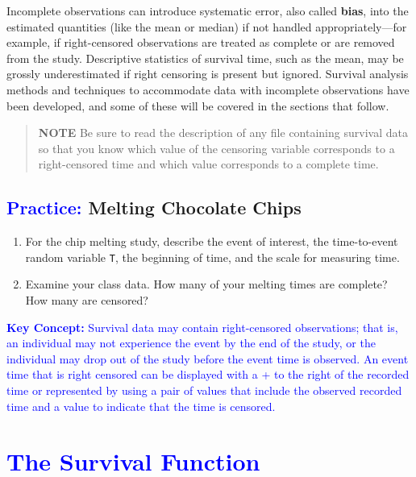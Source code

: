 \documentclass[
]{report}
\begin{document}
Incomplete observations can introduce systematic error, also called \textbf{bias}, into the estimated quantities (like the mean or median) if not handled appropriately---for example, if right-censored observations are treated as complete or are removed from the study. Descriptive statistics of survival time, such as the mean, may be grossly underestimated if right censoring is present but ignored. Survival analysis methods and techniques to accommodate data with incomplete observations have been developed, and some of these will be covered in the sections that follow.

\begin{quote}
\textbf{NOTE}
Be sure to read the description of any file containing survival data so that you know which value of the censoring variable corresponds to a right-censored time and which value corresponds to a complete time.
\end{quote}

\hypertarget{melting-chocolate-chips-1}{%
\subsection*{\texorpdfstring{\textcolor{blue}{Practice:} Melting Chocolate Chips}{ Melting Chocolate Chips}}\label{melting-chocolate-chips-1}}

\begin{enumerate}
\def\labelenumi{\arabic{enumi}.}
\setcounter{enumi}{1}
\item
  For the chip melting study, describe the event of interest, the time-to-event random variable \texttt{T}, the beginning of time, and the scale for measuring time.
\item
  Examine your class data. How many of your melting times are complete? How many are censored?
\end{enumerate}

\textbf{\textcolor{blue}{Key Concept:}}
\textcolor{blue}{Survival data may contain right-censored observations; that is, an individual may not experience the event by the end of the study, or the individual may drop out of the study before the event time is observed. An event time that is right censored can be displayed with a + to the right of the recorded time or represented by using a pair of values that include the observed recorded time and a value to indicate that the time is censored.}

\hypertarget{section-79}{%
\section{\texorpdfstring{\textcolor{blue}{The Survival Function}}{}}\label{section-79}}
\end{document}
